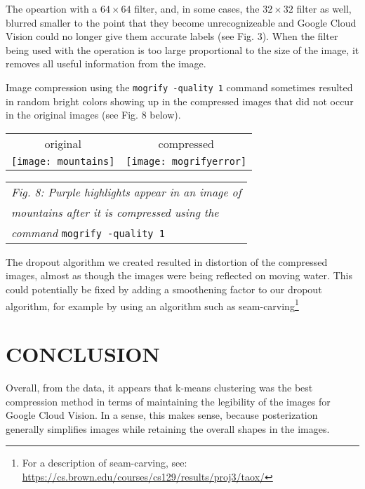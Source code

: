 \documentclass[letterpaper, 10 pt, conference]{ieeeconf}  %
\begin{document}
The  opeartion with a $64 \times 64$ filter,
and, in some cases, the $32 \times 32$ filter as well, 
blurred smaller to the point that they become unrecognizeable and
Google Cloud Vision could no longer give them accurate labels (see 
Fig. 3). When the filter being used with the  
operation is too large proportional to the size of the image, it
removes all useful information from the image. 

Image compression using the {\tt mogrify -quality 1} command
sometimes resulted in random bright colors showing up in the compressed
images that did not occur in the original images (see Fig. 8 below).

\vspace*{3mm}
\begin{tabular}{c c}
	original & compressed \\
	\texttt{[image: mountains]} &
		\texttt{[image: mogrifyerror]} \\
\end{tabular}
\begin{tabular}{l}
	\hspace*{4mm} {\it Fig. 8: Purple highlights appear in an image of } \\
	\hspace*{4mm} {\it mountains after it is compressed using the } \\
	\hspace*{4mm} {\it command} {\tt mogrify -quality 1} \\
\end{tabular}
\vspace*{3mm}

The dropout algorithm we created resulted in distortion of
the compressed images, almost as though the images
were being reflected on moving water. 
This could potentially be fixed by adding a smoothening
factor to our dropout algorithm, for example by 
using an algorithm such as seam-carving\footnote{For a description
of seam-carving, see: \url{https://cs.brown.edu/courses/cs129/results/proj3/taox/}}

\section{CONCLUSION}

Overall, from the data, it appears that k-means clustering was
the best compression method in terms of maintaining the legibility
of the images for Google Cloud Vision. In a sense, this makes
sense, because posterization generally simplifies images while
retaining the overall shapes in the images.
\end{document}

